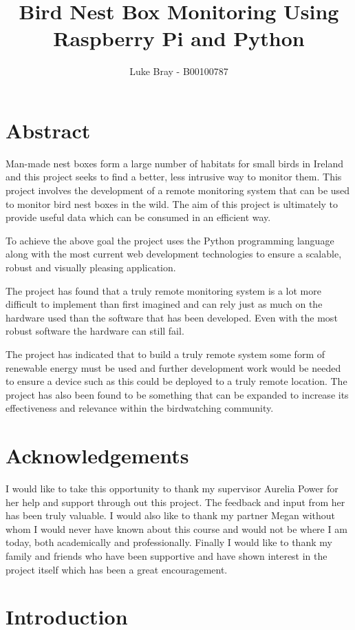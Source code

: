 \documentclass[10pt,a4paper]{article}
\author{Luke Bray - B00100787}
\title{Bird Nest Box Monitoring Using Raspberry Pi and Python}
\begin{document}

\pagebreak
\section{Abstract}
Man-made nest boxes form a large number of habitats for small birds in Ireland and this project seeks to find a better, less intrusive way to monitor them. 
This project involves the development of a remote monitoring system that can be used to monitor bird nest boxes in the wild. The aim of this project is ultimately to provide useful data which can be consumed in an efficient way. 

To achieve the above goal the project uses the Python programming language along with the most current web development technologies to ensure a scalable, robust and visually pleasing application. 

The project has found that a truly remote monitoring system is a lot more difficult to implement than first imagined and can rely just as much on the hardware used than the software that has been developed. Even with the most robust software the hardware can still fail. 

The project has indicated that to build a truly remote system some form of renewable energy must be used and further development work would be needed to ensure a device such as this could be deployed to a truly remote location. The project has also been found to be something that can be expanded to increase its effectiveness and relevance within the birdwatching community. 

\pagebreak
\section{Acknowledgements}
I would like to take this opportunity to thank my supervisor Aurelia Power for her help and support through out this project. The feedback and input from her has been truly valuable.
I would also like to thank my partner Megan without whom I would never have known about this course and would not be where I am today, both academically and professionally. 
Finally I would like to thank my family and friends who have been supportive and have shown interest in the project itself which has been a great encouragement.  
\pagebreak
\tableofcontents
\pagebreak
\section{Introduction}
\end{document}
